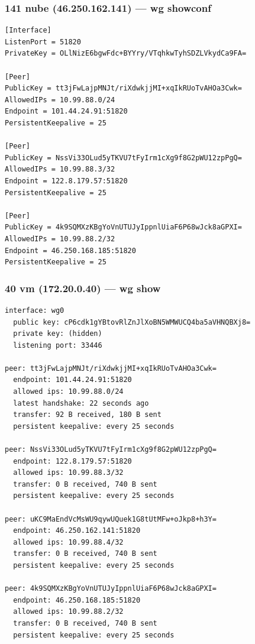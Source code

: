 \documentclass[11pt,a4paper]{article}
\begin{document}
\subsubsection*{141 nube (46.250.162.141) — wg showconf}
\begin{lstlisting}
[Interface]
ListenPort = 51820
PrivateKey = OLlNizE6bgwFdc+BYYry/VTqhkwTyhSDZLVkydCa9FA=

[Peer]
PublicKey = tt3jFwLajpMNJt/riXdwkjjMI+xqIkRUoTvAHOa3Cwk=
AllowedIPs = 10.99.88.0/24
Endpoint = 101.44.24.91:51820
PersistentKeepalive = 25

[Peer]
PublicKey = NssVi33OLud5yTKVU7tFyIrm1cXg9f8G2pWU12zpPgQ=
AllowedIPs = 10.99.88.3/32
Endpoint = 122.8.179.57:51820
PersistentKeepalive = 25

[Peer]
PublicKey = 4k9SQMXzKBgYoVnUTUJyIppnlUiaF6P68wJck8aGPXI=
AllowedIPs = 10.99.88.2/32
Endpoint = 46.250.168.185:51820
PersistentKeepalive = 25

\end{lstlisting}

\subsubsection*{40 vm (172.20.0.40) — wg show}
\begin{lstlisting}
interface: wg0
  public key: cP6cdk1gYBtovRlZnJlXoBN5WMWUCQ4ba5aVHNQBXj8=
  private key: (hidden)
  listening port: 33446

peer: tt3jFwLajpMNJt/riXdwkjjMI+xqIkRUoTvAHOa3Cwk=
  endpoint: 101.44.24.91:51820
  allowed ips: 10.99.88.0/24
  latest handshake: 22 seconds ago
  transfer: 92 B received, 180 B sent
  persistent keepalive: every 25 seconds

peer: NssVi33OLud5yTKVU7tFyIrm1cXg9f8G2pWU12zpPgQ=
  endpoint: 122.8.179.57:51820
  allowed ips: 10.99.88.3/32
  transfer: 0 B received, 740 B sent
  persistent keepalive: every 25 seconds

peer: uKC9MaEndVcMsWU9qywUQuek1G8tUtMFw+oJkp8+h3Y=
  endpoint: 46.250.162.141:51820
  allowed ips: 10.99.88.4/32
  transfer: 0 B received, 740 B sent
  persistent keepalive: every 25 seconds

peer: 4k9SQMXzKBgYoVnUTUJyIppnlUiaF6P68wJck8aGPXI=
  endpoint: 46.250.168.185:51820
  allowed ips: 10.99.88.2/32
  transfer: 0 B received, 740 B sent
  persistent keepalive: every 25 seconds

\end{lstlisting}
\end{document}

